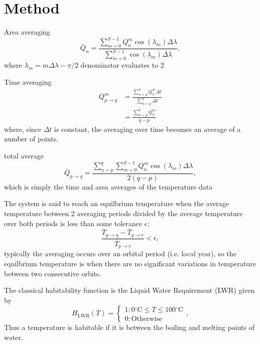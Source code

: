 \documentclass[12pt, onecolumn]{revtex4-2}    %
\newcommand{\degreesC}{\ensuremath{^{\circ}\text{C}}}
\begin{document}
\section{Method} \label{sec:Method}
Area averaging
\begin{equation}
  \bar{Q}_n = \frac{\sum_{m = 0}^{S-1} Q^m_n \cos(\lambda_m) \Delta\lambda}{\sum_{m = 0}^{S-1} \cos(\lambda_m) \Delta\lambda},
  \label{eq:Q_areaaveraged}
\end{equation}
where $\lambda_m = m \Delta\lambda - \pi / 2$ denominator evaluates to 2

Time averaging
\begin{equation}
  \begin{split}
    Q^m_{p \to q} & = \frac{\sum_{n=p}^{q} Q^m_n \Delta t} {\sum_{n=p}^{q} \Delta t} \\
                  & = \frac{\sum_{n=p}^{q} Q^m_n}{q-p}
  \end{split}
  \label{eq:Q_timeaverage}
\end{equation}
where, since $\Delta t$ is constant, the averaging over time becomes an average of a number of points.

total average
\begin{equation}
  \bar{Q}_{p \to q} = \frac{\sum_{n=p}^{q} \sum_{m = 0}^{S-1} Q^m_n \cos(\lambda_m) \Delta\lambda}{2(q-p)},
  \label{eq:Q_totalaverage}
\end{equation}
which is simply the time and area averages of the temperature data

The system is said to reach an equilbrium temperature when the average temperature between 2 averaging periods divided by the average temperature over both periods is less than some tolerance $\epsilon$:
\begin{equation}
  \frac{\bar{T}_{p \to q} - \bar{T}_{q \to r}}{\bar{T}_{p \to r}} < \epsilon,
  \label{eq:T_equilb}
\end{equation}
typically the averaging occurs over an orbital period (i.e. local year), so the equilbrium temperature is when there are no significant variations in temperature between two consecutive orbits.

The classical habitability function is the Liquid Water Requirement (LWR) given by
\begin{equation}
  H_\text{LWR}(T) =
  \begin{cases}
    1 : 0\degreesC \le T \le 100\degreesC \\
    0 : \text{Otherwise}
  \end{cases},
  \label{eq:H_LWR}
\end{equation}
Thus a temperature is habitable if it is between the boiling and melting points of water.
\end{document}
